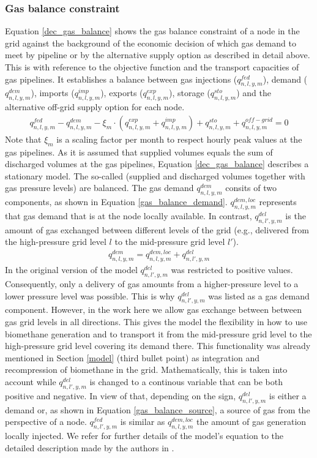 \subsubsection{Gas balance constraint}
Equation \ref{dec_gas_balance} shows the gas balance constraint of a node in the grid against the background of the economic decision of which gas demand to meet by pipeline or by the alternative supply option as described in detail above. This is with reference to the objective function and the transport capacities of gas pipelines. It establishes a balance between gas injections ($q^{fed}_{n,l,y,m}$), demand ($q^{dem}_{n,l,y,m}$), imports ($q^{imp}_{n,l,y,m}$), exports ($q^{exp}_{n,l,y,m}$), storage ($q^{sto}_{n,l,y,m}$) and the alternative off-grid supply option for each node.
\begin{align}\label{dec_gas_balance}
	q^{fed}_{n,l,y,m} - q^{dem}_{n,l,y,m} - \xi_m \cdot \left(q^{exp}_{n,l,y,m} + q^{imp}_{n,l,y,m}\right) + q^{sto}_{n,l,y,m}+q^{off-grid}_{n,l,y,m}=0
\end{align}
Note that $\xi_m$ is a scaling factor per month to respect hourly peak values at the gas pipelines. As it is assumed that supplied volumes equals the sum of discharged volumes at the gas pipelines, Equation \ref{dec_gas_balance} describes a stationary model. The so-called (supplied and discharged volumes together with gas pressure levels) are balanced. The gas demand $q^{dem}_{n,l,y,m}$ consits of two components, as shown in Equation \ref{gas_balance_demand}. $q^{dem,loc}_{n,l,y,m}$ represents that gas demand that is at the node locally available. In contrast, $q^{del}_{n,l',y,m}$ is the amount of gas exchanged between different levels of the grid (e.g., delivered from the high-pressure grid level $l$ to the mid-pressure grid level $l'$). 
\begin{align}\label{gas_balance_demand}
	q^{dem}_{n,l,y,m} = q^{dem,loc}_{n,l,y,m} + q^{del}_{n,l',y,m}
\end{align}
In the original version of the model $q^{del}_{n,l',y,m}$ was restricted to positive values. Consequently, only a delivery of gas amounts from a higher-pressure level to a lower pressure level was possible. This is why $q^{del}_{n,l',y,m}$ was listed as a gas demand component. However, in the work here we allow gas exchange between between gas grid levels in all directions. This gives the model the flexibility in how to use biomethane generation and to transport it from the mid-pressure grid level to the high-pressure grid level covering its demand there. This functionality was already mentioned in Section \ref{model} (third bullet point) as integration and recompression of biomethane in the grid. Mathematically, this is taken into account while $q^{del}_{n,l',y,m}$ is changed to a continous variable that can be both positive and negative. In view of that, depending on the sign, $q^{del}_{n,l',y,m}$ is either a demand or, as shown in Equation \ref{gas_balance_source}, a source of gas from the perspective of a node. $q^{fed}_{n,l',y,m}$ is similar as $q^{dem,loc}_{n,l,y,m}$ the amount of gas generation locally injected. We refer for further details of the model's equation to the detailed description made by the authors in \cite{zwickl2023design}.
